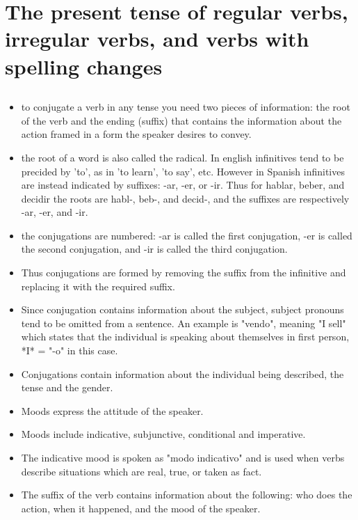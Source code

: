 \chapter{The present tense of regular  verbs, irregular verbs, and  verbs with spelling changes}

    \section{}

    \begin{itemize}
        \item to conjugate a verb in any tense you need two pieces of information: the root of the verb and the ending (suffix) that contains the information about the action framed in a form the speaker desires to convey.
        \item the root of a word is also called the radical. In english infinitives tend to be precided by 'to', as in 'to learn', 'to say', etc. However in Spanish infinitives are instead indicated by suffixes: -ar, -er, or -ir. Thus for hablar, beber, and decidir the roots are habl-, beb-, and decid-, and the suffixes are respectively -ar, -er, and -ir.
        \item the conjugations are numbered: -ar is called the first conjugation, -er is called the second conjugation, and -ir is called the third conjugation.
        \item Thus conjugations are formed by removing the suffix from the infinitive and replacing it with the required suffix.
        \item Since conjugation contains information about the subject, subject pronouns tend to be omitted from a sentence. An example is "vendo", meaning "I sell" which states that the individual is speaking about themselves in first person, *I* = "-o" in this case.
        \item Conjugations contain information about the individual being described, the tense and the gender.
        \item Moods express the attitude of the speaker.
        \item Moods include indicative, subjunctive, conditional and imperative.
        \item The indicative mood is spoken as "modo indicativo" and is used when verbs describe situations which are real, true, or taken as fact.
        \item The suffix of the verb contains information about the following: who does the action, when it happened, and the mood of the speaker.
    \end{itemize}

